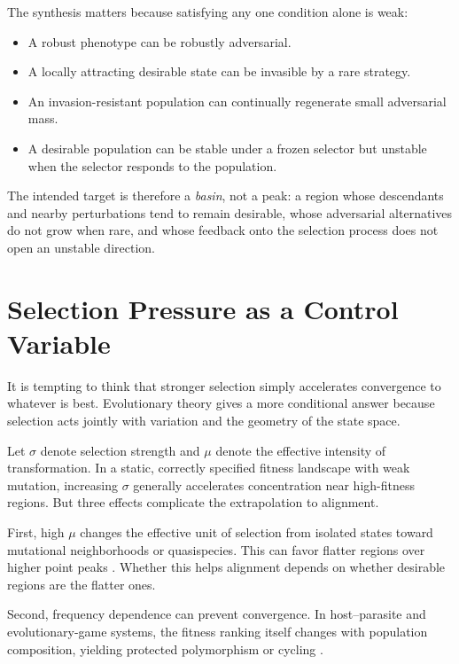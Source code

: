 \documentclass[11pt]{article}
\begin{document}
The synthesis matters because satisfying any one condition alone is weak:

\begin{itemize}
    \item A robust phenotype can be robustly adversarial.
    \item A locally attracting desirable state can be invasible by a rare strategy.
    \item An invasion-resistant population can continually regenerate small adversarial mass.
    \item A desirable population can be stable under a frozen selector but unstable when the selector responds to the population.
\end{itemize}

The intended target is therefore a \emph{basin}, not a peak: a region whose descendants and nearby perturbations tend to remain desirable, whose adversarial alternatives do not grow when rare, and whose feedback onto the selection process does not open an unstable direction.

\section{Selection Pressure as a Control Variable}

It is tempting to think that stronger selection simply accelerates convergence to whatever is best. Evolutionary theory gives a more conditional answer because selection acts jointly with variation and the geometry of the state space.

Let $\sigma$ denote selection strength and $\mu$ denote the effective intensity of transformation. In a static, correctly specified fitness landscape with weak mutation, increasing $\sigma$ generally accelerates concentration near high-fitness regions. But three effects complicate the extrapolation to alignment.

First, high $\mu$ changes the effective unit of selection from isolated states toward mutational neighborhoods or quasispecies. This can favor flatter regions over higher point peaks \parencite{wilke2001,hermisson2002}. Whether this helps alignment depends on whether desirable regions are the flatter ones.

Second, frequency dependence can prevent convergence. In host--parasite and evolutionary-game systems, the fitness ranking itself changes with population composition, yielding protected polymorphism or cycling \parencite{buckingham2022,papkou2019}.
\end{document}

